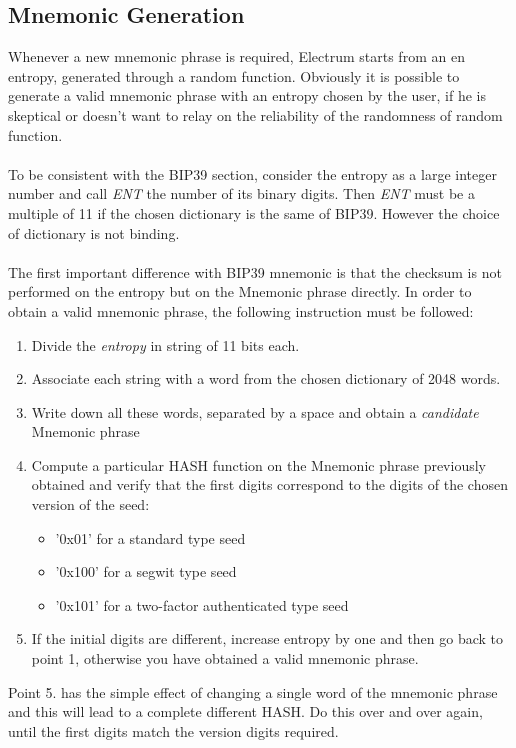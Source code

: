 \subsection{Mnemonic Generation}
Whenever a new mnemonic phrase is required, Electrum starts from an en entropy, generated through a random function. Obviously it is possible to generate a valid mnemonic phrase with an entropy chosen by the user, if he is skeptical or doesn't want to relay on the reliability of the randomness of random function.
\\ \\
To be consistent with the BIP39 section, consider the entropy as a large integer number and call \textit{ENT} the number of its binary digits. Then \textit{ENT} must be a multiple of 11 if the chosen dictionary is the same of BIP39. However the choice of dictionary is not binding.
\\ \\
The first important difference with BIP39 mnemonic is that the checksum is not performed on the entropy but on the Mnemonic phrase directly. In order to obtain a valid mnemonic phrase, the following instruction must be followed:
\begin{enumerate}
	\item Divide the \textit{entropy} in string of 11 bits each.
	\item Associate each string with a word from the chosen dictionary of 2048 words.
	\item Write down all these words, separated by a space and obtain a \textit{candidate} Mnemonic phrase
	\item Compute a particular HASH function on the Mnemonic phrase previously obtained and verify that the first digits correspond to the digits of the chosen version of the seed:
	\begin{itemize}
		\item '0x01' for a standard type seed
		\item '0x100' for a segwit type seed
		\item '0x101' for a two-factor authenticated type seed
	\end{itemize}
	\item If the initial digits are different, increase entropy by one and then go back to point 1, otherwise you have obtained a valid mnemonic phrase.
\end{enumerate}
Point 5. has the simple effect of changing a single word of the mnemonic phrase and this will lead to a complete different HASH. Do this over and over again, until the first digits match the version digits required.
